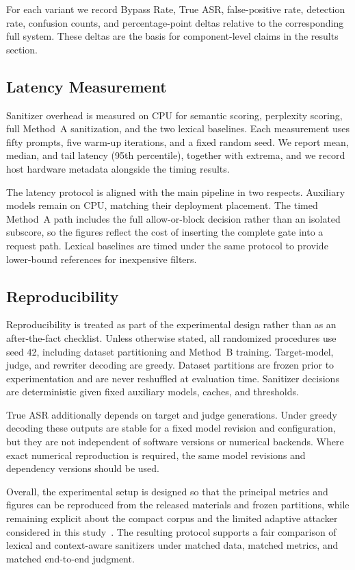 ﻿\documentclass[10pt]{article}
\begin{document}
For each variant we record Bypass Rate, True ASR, false-positive rate, detection rate, confusion counts, and percentage-point deltas relative to the corresponding full system.
These deltas are the basis for component-level claims in the results section.

\subsection{Latency Measurement}
\label{sec:latency-setup}

Sanitizer overhead is measured on CPU for semantic scoring, perplexity scoring, full Method~A sanitization, and the two lexical baselines.
Each measurement uses fifty prompts, five warm-up iterations, and a fixed random seed.
We report mean, median, and tail latency (95th percentile), together with extrema, and we record host hardware metadata alongside the timing results.

The latency protocol is aligned with the main pipeline in two respects.
Auxiliary models remain on CPU, matching their deployment placement.
The timed Method~A path includes the full allow-or-block decision rather than an isolated subscore, so the figures reflect the cost of inserting the complete gate into a request path.
Lexical baselines are timed under the same protocol to provide lower-bound references for inexpensive filters.

\subsection{Reproducibility}
\label{sec:repro-setup}

Reproducibility is treated as part of the experimental design rather than as an after-the-fact checklist.
Unless otherwise stated, all randomized procedures use seed 42, including dataset partitioning and Method~B training.
Target-model, judge, and rewriter decoding are greedy.
Dataset partitions are frozen prior to experimentation and are never reshuffled at evaluation time.
Sanitizer decisions are deterministic given fixed auxiliary models, caches, and thresholds.

True ASR additionally depends on target and judge generations.
Under greedy decoding these outputs are stable for a fixed model revision and configuration, but they are not independent of software versions or numerical backends.
Where exact numerical reproduction is required, the same model revisions and dependency versions should be used.

Overall, the experimental setup is designed so that the principal metrics and figures can be reproduced from the released materials and frozen partitions, while remaining explicit about the compact corpus and the limited adaptive attacker considered in this study~\cite{owasp_llm,zizzo2025adversarial}.
The resulting protocol supports a fair comparison of lexical and context-aware sanitizers under matched data, matched metrics, and matched end-to-end judgment.
\end{document}
